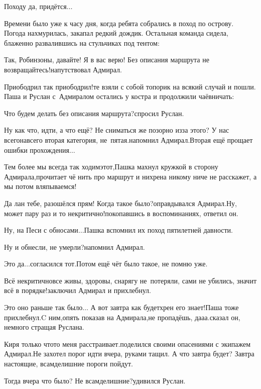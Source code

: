 \diagdash Походу да, придётся$\ldots$

Времени было уже к часу дня, когда ребята собрались в поход по острову. Погода нахмурилась, закапал редкий дождик. Остальная команда сидела, блаженно развалившись на стульчиках под тентом:

\diagdash Так, Робинзоны, давайте! Я в вас верю! Без описания маршрута не возвращайтесь!\mdash напутствовал Адмирал.

\diagdash Приободрил так приободрил!\mdash те взяли с собой топорик на всякий случай и пошли. Паша и Руслан с~Адмиралом остались у костра и продолжили чаёвничать:

\diagdash Что будем делать без описания маршрута?\mdash спросил Руслан.

\diagdash Ну как что, идти, а что ещё? Не сниматься же позорно из\sdash за этого? У нас всего\sdash навсего вторая категория, не~пятая.\mdash напомнил Адмирал.\mdash Вторая ещё прощает ошибки прохождения$\ldots$

\diagdash Тем более мы всегда так ходим\mdash этот,\mdash Пашка махнул кружкой в сторону Адмирала,\mdash прочитает чё нить про маршрут и нихрена никому ниче не расскажет, а мы потом вляпываемся!

\diagdash Да лан тебе, разошёлся прям! Когда такое было?\mdash оправдывался Адмирал.\mdash Ну, может пару раз и то некритично!\mdash покопавшись в воспоминаниях, ответил он.

\diagdash Ну, на Песи с обносами$\ldots$\mdash Пашка вспомнил их поход пятилетней давности.

\diagdash Ну и обнесли, не умерли?\mdash напомнил Адмирал.

\diagdash Это да$\ldots$\mdash согласился тот.\mdash Потом ещё чёт было такое, не помню уже.

\diagdash Всё некритично\mdash все живы, здоровы, снарягу не~потеряли, сами не убились, значит всё в порядке!\mdash заключил Адмирал и прихлебнул.

\diagdash Это оно раньше так было$\ldots$ А вот завтра как будет\mdash хрен его знает!\mdash Паша тоже прихлебнул.\mdash C ним,\mdash опять показав на Адмирала,\mdash не пропадёшь, да\sdash а\sdash а.\mdash сказал он, немного стращая Руслана.

\diagdash Киря только что\sdash то меня расстраивает.\mdash поделился своими опасениями с экипажем Адмирал.\mdash Не захотел порог идти вчера, руками тащил. А что завтра будет? Завтра настоящие, всамделишние пороги пойдут.

\diagdash Тогда вчера что было? Не всамделишние?\mdash удивился Руслан.

